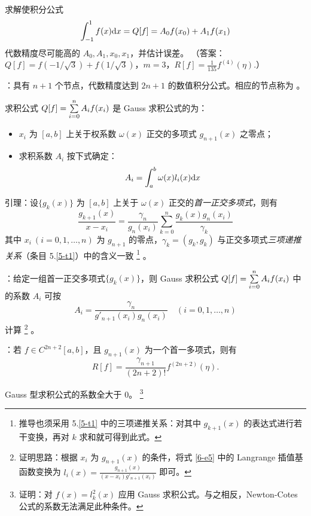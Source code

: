 \example 求解使积分公式
\[ \int_{-1}^1f(x)\mathrm{d} x=Q[f]=A_0f(x_0)+A_1f(x_1) \]
代数精度尽可能高的 $A_0,A_1,x_0,x_1$，并估计误差。
（答案：$Q[f]=f(-1/\sqrt3)+f(1/\sqrt3)$，$m=3$，$R[f]=\frac1{135}f^{(4)}(\eta)$.）

\entry {}：具有 $n+1$ 个节点，代数精度达到 $2n+1$ 的数值积分公式。相应的节点称为 。

\trm 求积公式 $Q[f]=\sum\limits_{i=0}^nA_if(x_i)$ 是 Gauss 求积公式的为：
\begin{itemize}\tl
    \item $x_i$ 为 $[a,b]$ 上关于权系数 $\omega(x)$ 正交的多项式 $g_{n+1}(x)$ 之零点；
    \item 求积系数 $A_i$ 按下式确定：
    \begin{equation}\label{6-e5}
    A_i=\int_a^b\omega(x)l_i(x)\mathrm{d} x
    \end{equation}
\end{itemize}

\trm 引理：设$\{g_k(x)\}$ 为 $[a,b]$ 上关于 $\omega(x)$ 正交的\emph{首一正交多项式}，则有
\begin{equation}
\frac{g_{k+1}(x)}{x-x_i}=\frac{\gamma_n}{g_n(x_i)}\sum_{k=0}^n\frac{g_k(x)
g_n(x_i)}{\gamma_k}
\end{equation}
其中 $x_i\ (i=0,1,\ldots,n)$ 为 $g_{n+1}$ 的零点，$\gamma_k=(g_k,g_k)$ 与正交多项式\emph{三项递推关系}（条目 5.\ref{5-t1}）中的含义一致
\footnote{推导也须采用 5.\ref{5-t1} 中的三项递推关系：对其中 $g_{k+1}(x)$ 的表达式进行若干变换，再对 $k$ 求和就可得到此式。}
。

\trm {}：给定一组首一正交多项式$\{g_k(x)\}$，则 Gauss 求积公式 $Q[f]=\sum\limits_{i=0}^nA_if(x_i)$ 中的系数 $A_i$ 可按
\begin{equation}\label{6-e3}
A_i=\frac{\gamma_n}{g'_{n+1}(x_i)g_n(x_i)}\quad(i=0,1,\ldots,n)
\end{equation}
计算
\footnote{证明思路：根据 $x_i$ 为 $g_{n+1}(x)$ 的条件，将式 \eqref{6-e5} 中的 Langrange 插值基函数变换为 $l_i(x)=\frac{g_{n+1}(x)}{(x-x_i)g'_{n+1}(x_i)}$ 即可。}
。

\trm {}：若 $f\in C^{2n+2}[a,b]$，且 $g_{n+1}(x)$ 为一个首一多项式，则有
\begin{equation}\label{6-e4}
R[f]=\frac{\gamma_{n+1}}{(2n+2)!}f^{(2n+2)}(\eta).
\end{equation}

\trm Gauss 型求积公式的系数全大于 $0$。
\footnote{证明：对 $f(x)=l_k^2(x)$ 应用 Gauss 求积公式。与之相反，Newton-Cotes 公式的系数无法满足此种条件。}

